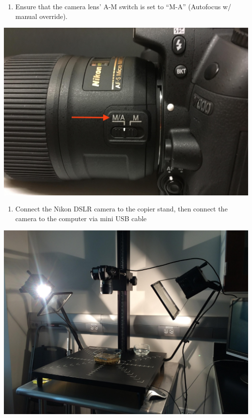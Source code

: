 \documentclass[
]{book}
\providecommand{\tightlist}{%
  \setlength{\itemsep}{0pt}\setlength{\parskip}{0pt}}
\begin{document}
\begin{enumerate}
\def\labelenumi{\arabic{enumi}.}
\setcounter{enumi}{1}
\tightlist
\item
  Ensure that the camera lens' A-M switch is set to ``M-A'' (Autofocus w/ manual override).
\end{enumerate}

\includegraphics{images/Camera8.jpg}

\begin{enumerate}
\def\labelenumi{\arabic{enumi}.}
\setcounter{enumi}{2}
\tightlist
\item
  Connect the Nikon DSLR camera to the copier stand, then connect the camera to the computer via mini USB cable
\end{enumerate}

\includegraphics{images/Camera9.jpg}
\end{document}
